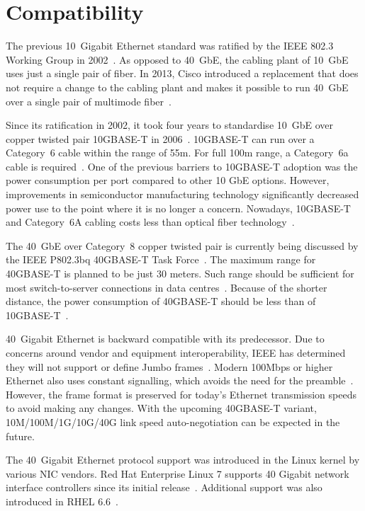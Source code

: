 
\section{Compatibility}\label{sec:40gbe-compatibility}
The previous 10~Gigabit Ethernet standard was ratified by the IEEE 802.3 Working Group in 2002~\cite{ieee-802.3ae}.
As opposed to 40~GbE, the cabling plant of 10~GbE uses just a single pair of fiber.
In 2013, Cisco introduced a replacement that does not require a change to the cabling plant
and makes it possible to run 40~GbE over a single pair of multimode fiber~\cite{40gbe-mmf}.

Since its ratification in 2002,
it took four years to standardise 10~GbE over copper twisted pair 10GBASE-T in 2006~\cite{ieee-802.3an}.
10GBASE-T can run over a Category~6 cable within the range of 55m.
For full 100m range, a Category~6a cable is required~\cite{ieee-802.3an}.
One of the previous barriers to 10GBASE-T adoption was the power consumption per port compared to other 10 GbE options.
However, improvements in semiconductor manufacturing technology
significantly decreased power use to the point where it is no longer a concern.
Nowadays, 10GBASE-T and Category~6A cabling costs less than optical fiber technology~\cite{belden-10g-40g}.

The 40~GbE over Category~8 copper twisted pair
is currently being discussed by the IEEE P802.3bq 40GBASE-T Task Force~\cite{ieee-802.3bq}.
The maximum range for 40GBASE-T is planned to be just 30 meters.
Such range should be sufficient for most switch-to-server connections in data centres~\cite{ieee-802.3bq}.
Because of the shorter distance, the power consumption of 40GBASE-T should be less than of 10GBASE-T~\cite{belden-10g-40g}.

40~Gigabit Ethernet is backward compatible with its predecessor.
Due to concerns around vendor and equipment interoperability,
IEEE has determined they will not support or define Jumbo frames~\cite{ea-jumbo-frames}.
Modern 100Mbps or higher Ethernet also uses constant signalling, which avoids the need for the preamble~\cite{anatomy-frame}.
However, the frame format is preserved for today's Ethernet transmission speeds to avoid making any changes.
With the upcoming 40GBASE-T variant, 10M/100M/1G/10G/40G link speed auto-negotiation can be expected in the future.

The 40~Gigabit Ethernet protocol support was introduced in the Linux kernel by various NIC vendors.
Red Hat Enterprise Linux 7 supports 40 Gigabit network interface controllers since its initial release~\cite{rhel-7-announce}.
Additional support was also introduced in RHEL 6.6~\cite{rhel-66-announce}.
